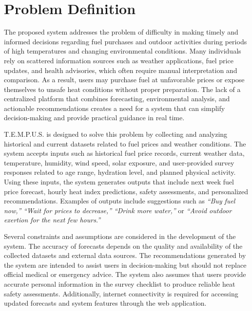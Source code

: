 \documentclass[12pt]{article}
\begin{document}
\section{Problem Definition}

The proposed system addresses the problem of difficulty in making timely and informed decisions regarding fuel purchases and outdoor activities during periods of high temperatures and changing environmental conditions. Many individuals rely on scattered information sources such as weather applications, fuel price updates, and health advisories, which often require manual interpretation and comparison. As a result, users may purchase fuel at unfavorable prices or expose themselves to unsafe heat conditions without proper preparation. The lack of a centralized platform that combines forecasting, environmental analysis, and actionable recommendations creates a need for a system that can simplify decision-making and provide practical guidance in real time.

T.E.M.P.U.S. is designed to solve this problem by collecting and analyzing historical and current datasets related to fuel prices and weather conditions. The system accepts inputs such as historical fuel price records, current weather data, temperature, humidity, wind speed, solar exposure, and user-provided survey responses related to age range, hydration level, and planned physical activity. Using these inputs, the system generates outputs that include next week fuel price forecast, hourly heat index predictions, safety assessments, and personalized recommendations. Examples of outputs include suggestions such as \textit{``Buy fuel now,''} \textit{``Wait for prices to decrease,''} \textit{``Drink more water,''} or \textit{``Avoid outdoor exertion for the next few hours.''}

Several constraints and assumptions are considered in the development of the system. The accuracy of forecasts depends on the quality and availability of the collected datasets and external data sources. The recommendations generated by the system are intended to assist users in decision-making but should not replace official medical or emergency advice. The system also assumes that users provide accurate personal information in the survey checklist to produce reliable heat safety assessments. Additionally, internet connectivity is required for accessing updated forecasts and system features through the web application.
\end{document}
